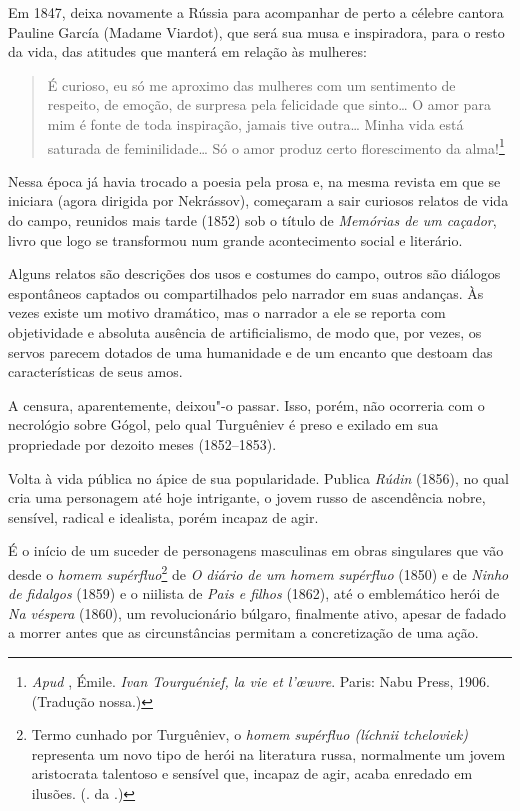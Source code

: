 Em 1847, deixa novamente a Rússia para acompanhar de perto a célebre
cantora Pauline García (Madame Viardot), que será sua musa e inspiradora, para o
resto da vida, das atitudes que manterá em relação às mulheres:

\begin{quotation}
É curioso, eu só me aproximo das mulheres com um sentimento de
respeito, de emoção, de surpresa pela felicidade que sinto\ldots{} O amor para
mim é fonte de toda inspiração, jamais tive outra\ldots{} Minha vida está
saturada de feminilidade\ldots{} Só o amor produz certo florescimento da
alma!\footnote{\emph{Apud} , Émile. \emph{Ivan Tourguénief, la vie et l'œuvre}.
Paris: Nabu Press, 1906. (Tradução nossa.)}
\end{quotation}

Nessa época já havia trocado a poesia pela prosa e, na mesma revista
em que se iniciara (agora dirigida por Nekrássov), começaram a sair curiosos relatos de vida do
campo, reunidos mais tarde (1852) sob o título de \emph{Memórias
de um caçador}, livro que logo se transformou num grande acontecimento social
e literário.

Alguns relatos são descrições dos usos e costumes do campo, outros são diálogos
espontâneos captados ou compartilhados pelo narrador em suas andanças.
Às vezes existe um motivo dramático, mas o narrador a ele se
reporta com objetividade e absoluta ausência de artificialismo, de modo
que, por vezes, os servos parecem dotados de uma humanidade e de um encanto
que destoam das características de seus amos.

A censura, aparentemente, deixou"-o passar. Isso, porém, não ocorreria com o necrológio
sobre Gógol, pelo qual Turguêniev é preso e exilado em sua propriedade
por dezoito meses (1852--1853).

Volta à vida pública no ápice de sua popularidade. Publica \emph{Rúdin} (1856), no qual cria uma personagem até hoje
intrigante, o jovem russo de ascendência nobre, sensível, radical e
idealista, porém incapaz de agir.

É o início de um suceder de personagens masculinas em obras
singulares que vão desde o \emph{homem supérfluo}\footnote{Termo cunhado por Turguêniev, o \emph{homem supérfluo
(líchnii tcheloviek)} representa um novo tipo de herói na
literatura russa, normalmente um jovem aristocrata talentoso e
sensível que, incapaz de agir, acaba enredado em ilusões.
(. da .)} de \emph{O diário de um
homem supérfluo} (1850) e de \emph{Ninho de fidalgos} (1859) e o niilista de
\emph{Pais e filhos} (1862), até o emblemático herói de \emph{Na véspera}
(1860), um revolucionário búlgaro, finalmente ativo, apesar de fadado a
morrer antes que as circunstâncias permitam a concretização de uma ação.

